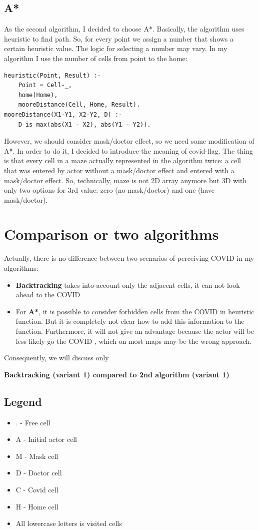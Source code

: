 \documentclass{article}
\newcommand{\C}{COVID }
\begin{document}
\subsection{A*}
As the second algorithm, I decided to choose A*.
Basically, the algorithm uses heuristic to find path. So, for every point we assign a number that shows a certain heuristic value. The logic for selecting a number may vary. In my algorithm I use the number of cells from point to the home:
\begin{verbatim}
heuristic(Point, Result) :-
    Point = Cell-_,
    home(Home),
    mooreDistance(Cell, Home, Result).
mooreDistance(X1-Y1, X2-Y2, D) :-
    D is max(abs(X1 - X2), abs(Y1 - Y2)).
\end{verbatim}

However, we should consider mask/doctor effect, so we need some modification of A*. In order to do it, I decided to introduce the meaning of covid-flag. The thing is that every cell in a maze actually represented in the algorithm twice: a cell that was entered  by actor without a mask/doctor effect and entered with a mask/doctor effect. So, technically, maze is not 2D array anymore but 3D with only two options for 3rd value: zero (no mask/doctor) and one (have mask/doctor).


\section{Comparison or two algorithms}

Actually, there is no difference between two scenarios of perceiving COVID in my algorithms:

\begin{itemize}
    \item \textbf{Backtracking} takes into account only the adjacent cells, it can not look ahead to the \C
    \item For \textbf{A*}, it is possible to consider forbidden cells from the \C in heuristic function. But it is completely not clear how to add this information to the function. Furthermore, it will not give an advantage because the actor will be less likely go the \C, which on most maps may be the wrong approach.
\end{itemize}

Consequently, we will discuss only 

\textbf{Backtracking (variant 1) compared to 2nd algorithm (variant 1)}


\subsection{Legend}
\begin{itemize}
    \item . - Free cell
    \item A - Initial actor cell
    \item M - Mask cell 
    \item D - Doctor cell
    \item C - Covid cell
    \item H - Home cell
    \item All lowercase letters is visited cells
\end{itemize}
\end{document}
